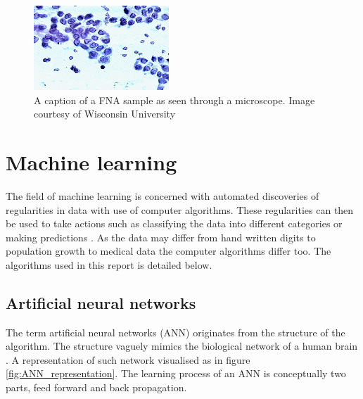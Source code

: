 \begin{figure}[ht!]
  \centering
  \includegraphics[]{images/fna_nuclei.png}
  \caption{A caption of a FNA sample as seen through a microscope. Image courtesy of Wisconsin University}
  \label{fig:fna_nuclei}
\end{figure}



\section{Machine learning}

The field of machine learning is concerned with automated discoveries of regularities in data with use of computer algorithms. These regularities can then be used to take actions such as classifying the data into different categories or making predictions \parencite{Bishop:2006}. As the data may differ from hand written digits to population growth to medical data the computer algorithms differ too. The algorithms used in this report is detailed below.

\subsection{Artificial neural networks}

The term artificial neural networks (ANN) originates from the structure of the algorithm. The structure vaguely mimics the biological network of a human brain \parencite{Bishop:2006}. A representation of such network visualised as in figure \ref{fig:ANN_representation}. The learning process of an ANN is conceptually two parts, feed forward and back propagation.

